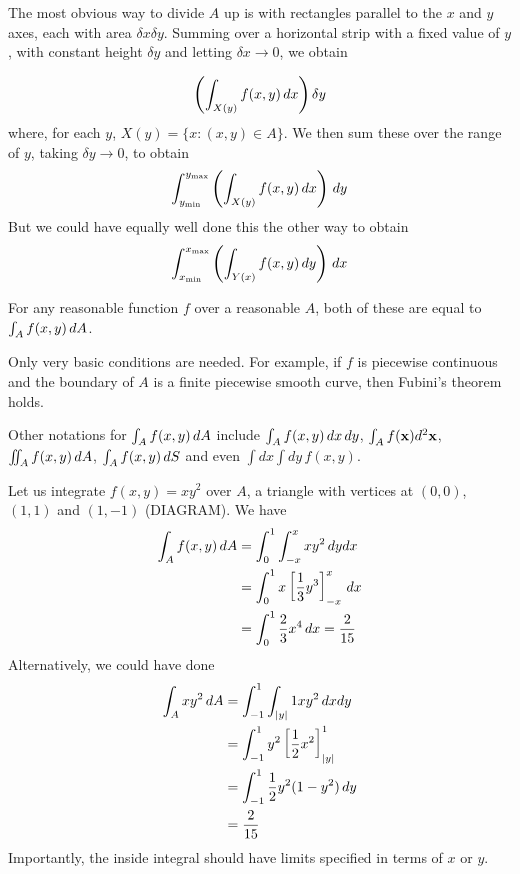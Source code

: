 \documentclass{../../template/note}
\begin{document}
    The most obvious way to divide \(A\) up is with rectangles parallel to the \(x\) and \(y\) axes, each with area \(\delta x \delta y\). Summing over a horizontal strip with a fixed value of \(y\), with constant height \(\delta y\) and letting \(\delta x \to 0\), we obtain
    
    \begin{align*}
        \left(\int_{X(y)} f(x, y) \,d{x}\right)\delta y
    \end{align*}
    where, for each \(y\), \(X(y) = \{x: (x, y) \in A\}\). We then sum these over the range of \(y\), taking \(\delta y \to 0\), to obtain
    \begin{align*}
        \int_{y_{\min}}^{y_{\max}}\left(\int_{X(y)} f(x, y) \,d{x}\right)\,d{y}
    \end{align*}
    But we could have equally well done this the other way to obtain 
    \begin{align*}
        \int_{x_{\min}}^{x_{\max}}\left(\int_{Y(x)} f(x, y) \,d{y}\right)\,d{x}
    \end{align*}
    
    \begin{proposition*}
        For any reasonable function \(f\) over a reasonable \(A\), both of these are equal to \(\int_A f(x, y) \,d{A}\).
    \end{proposition*}
    
    \begin{remark*}
        Only very basic conditions are needed. For example, if \(f\) is piecewise continuous and the boundary of \(A\) is a finite piecewise smooth curve, then Fubini's theorem holds.
    \end{remark*}
    
    Other notations for \(\int_A f(x, y) \,d{A}\) include \(\int_A f(x, y) \,d{x} \,d{y}\), \(\int_A f(\V x) d^2 \V x\), \(\iint_A f(x, y) \,d{A}\), \(\int_A f(x, y) \,d{S}\) and even \(\int dx \int dy\, f(x, y)\).

    \begin{example*}
        Let us integrate \(f(x, y) = xy^2\) over \(A\), a triangle with vertices at \((0, 0)\), \((1, 1)\) and \((1, -1)\) (DIAGRAM). We have
        \begin{align*}
            \int_A f(x, y) \,d{A} &= \int_0^1 \int_{-x}^x xy^2 \,d{y} dx \\
            &= \int_0^1 x\left[\frac 1 3 y^3\right]^x_{-x} \,d{x} \\
            &= \int_0^1 \frac 2 3 x^4 \,d{x} = \frac 2 {15}
        \end{align*}
        Alternatively, we could have done
        \begin{align*}
            \int_A xy^2 \,d{A} &= \int_{-1}^1 \int_{|y|}{1} xy^2 \,d{x} dy \\
            &= \int_{-1}^1 y^2 \left[\frac 1 2 x^2\right]_{|y|}^1 \\
            &= \int_{-1}^1 \frac 1 2 y^2 (1-y^2) \,d{y} \\
            &= \frac 2 {15}
        \end{align*}
        Importantly, the inside integral should have limits specified in terms of \(x\) or \(y\).       
    \end{example*}
    
\end{document}
